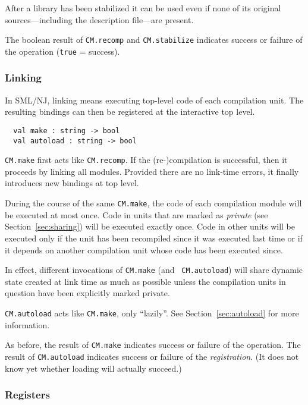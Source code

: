 \documentclass{article}
\begin{document}
After a library has been stabilized it can be used even if none of its
original sources---including the description file---are present.

The boolean result of {\tt CM.recomp} and {\tt CM.stabilize} indicates
success or failure of the operation ({\tt true} = success).

\subsubsection*{Linking}

In SML/NJ, linking means executing top-level code of each compilation
unit.  The resulting bindings can then be registered at the interactive top
level.

\begin{verbatim}
  val make : string -> bool
  val autoload : string -> bool
\end{verbatim}

{\tt CM.make} first acts like {\tt CM.recomp}.  If the (re-)compilation
is successful, then it proceeds by linking all modules.  Provided
there are no link-time errors, it finally introduces new bindings at
top level.

During the course of the same {\tt CM.make}, the code of each
compilation module will be executed at most once.  Code in units that
are marked as {\it private} (see Section~\ref{sec:sharing}) will be
executed exactly once.  Code in other units will be executed only if
the unit has been recompiled since it was executed last time or if it
depends on another compilation unit whose code has been executed
since.

In effect, different invocations of {\tt CM.make} (and {\tt
CM.autoload}) will share dynamic state created at link time as much as
possible unless the compilation units in question have been explicitly
marked private.

{\tt CM.autoload} acts like {\tt CM.make}, only ``lazily''. See
Section~\ref{sec:autoload} for more information.

As before, the result of {\tt CM.make} indicates success or failure of
the operation.  The result of {\tt CM.autoload} indicates success or
failure of the {\em registration}.  (It does not know yet whether
loading will actually succeed.)

\subsubsection*{Registers}
\end{document}
